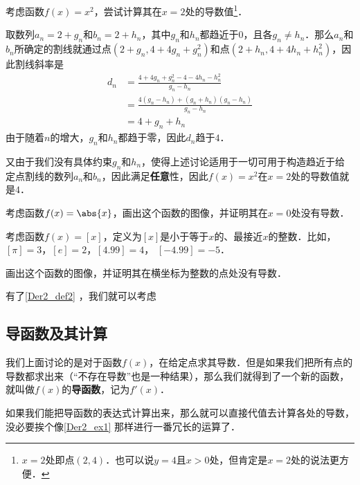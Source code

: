 \begin{example}{}\label{Der2_ex1}
考虑函数$f(x)=x^2$，尝试计算其在$x=2$处的导数值\footnote{$x=2$处即点$(2, 4)$．也可以说$y=4$且$x>0$处，但肯定是$x=2$处的说法更方便．}．

取数列$a_n=2+g_n$和$b_n=2+h_n$，其中$g_n$和$h_n$都趋近于$0$，且各$g_n\not=h_n$．那么$a_n$和$b_n$所确定的割线就通过点$(2+g_n, 4+4g_n+g_n^2)$和点$(2+h_n, 4+4h_n+h_n^2)$，因此割线斜率是
\begin{equation}
\begin{aligned}
d_n&=\frac{4+4g_n+g_n^2-4-4h_n-h_n^2}{g_n-h_n}\\
&=\frac{4(g_n-h_n)+(g_n+h_n)(g_n-h_n)}{g_n-h_n}\\
&=4+g_n+h_n
\end{aligned}
\end{equation}
由于随着$n$的增大，$g_n$和$h_n$都趋于零，因此$d_n$趋于$4$．

又由于我们没有具体约束$g_n$和$h_n$，使得上述讨论适用于一切可用于构造趋近于给定点割线的数列$a_n$和$b_n$，因此满足\textbf{任意}性，因此$f(x)=x^2$在$x=2$处的导数值就是$4$．
\end{example}

\begin{exercise}{}
考虑函数$f(x)=\abs{x}$，画出这个函数的图像，并证明其在$x=0$处没有导数．
\end{exercise}

\begin{exercise}{}
考虑函数$f(x)=[x]$，定义为$[x]$是小于等于$x$的、最接近$x$的整数．比如，$[\pi]=3$，$[e]=2$，$[4.99]=4$， $[-4.99]=-5$．

画出这个函数的图像，并证明其在横坐标为整数的点处没有导数．
\end{exercise}

有了\autoref{Der2_def2} ，我们就可以考虑






\subsection{导函数及其计算}

我们上面讨论的是对于函数$f(x)$，在给定点求其导数．但是如果我们把所有点的导数都求出来（“不存在导数”也是一种结果），那么我们就得到了一个新的函数，就叫做$f(x)$的\textbf{导函数}，记为$f'(x)$．

如果我们能把导函数的表达式计算出来，那么就可以直接代值去计算各处的导数，没必要挨个像\autoref{Der2_ex1} 那样进行一番冗长的运算了．

